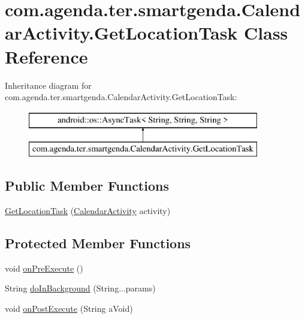 \hypertarget{classcom_1_1agenda_1_1ter_1_1smartgenda_1_1_calendar_activity_1_1_get_location_task}{\section{com.\-agenda.\-ter.\-smartgenda.\-Calendar\-Activity.\-Get\-Location\-Task Class Reference}
\label{classcom_1_1agenda_1_1ter_1_1smartgenda_1_1_calendar_activity_1_1_get_location_task}
}
Inheritance diagram for com.\-agenda.\-ter.\-smartgenda.\-Calendar\-Activity.\-Get\-Location\-Task\-:\begin{figure}[H]
\begin{center}
\leavevmode
\includegraphics[height=2.000000cm]{classcom_1_1agenda_1_1ter_1_1smartgenda_1_1_calendar_activity_1_1_get_location_task}
\end{center}
\end{figure}
\subsection*{Public Member Functions}
\begin{DoxyCompactItemize}
\item 
\hyperlink{classcom_1_1agenda_1_1ter_1_1smartgenda_1_1_calendar_activity_1_1_get_location_task_a4e288f46ba00540033d24bf2577b8a9d}{Get\-Location\-Task} (\hyperlink{classcom_1_1agenda_1_1ter_1_1smartgenda_1_1_calendar_activity}{Calendar\-Activity} activity)
\end{DoxyCompactItemize}
\subsection*{Protected Member Functions}
\begin{DoxyCompactItemize}
\item 
void \hyperlink{classcom_1_1agenda_1_1ter_1_1smartgenda_1_1_calendar_activity_1_1_get_location_task_aaf2ce216b27a9a3e369dfb20429949be}{on\-Pre\-Execute} ()
\item 
String \hyperlink{classcom_1_1agenda_1_1ter_1_1smartgenda_1_1_calendar_activity_1_1_get_location_task_aebb6b14f590692907a45722e8e4844cf}{do\-In\-Background} (String...\-params)
\item 
void \hyperlink{classcom_1_1agenda_1_1ter_1_1smartgenda_1_1_calendar_activity_1_1_get_location_task_a510d302394c404e6d4aaa7fe6803b7e9}{on\-Post\-Execute} (String a\-Void)
\end{DoxyCompactItemize}



